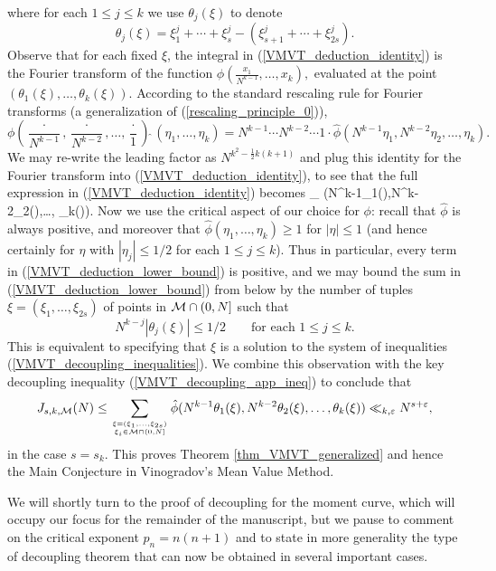 \documentclass[brochure,english,12pt]{bourbaki}%
\begin{document}
\eeq
where for each $1 \leq j \leq k$ we use $\theta_j(\xi)$ to denote
\[ \theta_j(\xi) = \xi_1^j + \cdots+ \xi_s^j  - (\xi_{s+1}^j + \cdots+ \xi_{2s}^j) .\]
Observe that for each fixed $\xi$, the integral  in (\ref{VMVT_deduction_identity}) is the Fourier transform of the function $\phi( \frac{x_1}{N^{k-1}}, \ldots, x_k),$ evaluated at the point $(\theta_1(\xi), \ldots, \theta_k(\xi))$. 
According to the standard rescaling rule for Fourier transforms (a generalization of (\ref{rescaling_principle_0})), 
\[  \phi ( \frac{\cdot}{N^{k-1}}, \frac{\cdot}{N^{k-2}},\ldots, \frac{\cdot}{1} ) \hat{\;}(\eta_1,\ldots, \eta_k) =  
N^{k-1} \cdots N^{k-2} \cdots 1 \cdot \hat{\phi} (N^{k-1}\eta_1,N^{k-2}\eta_2,\ldots, \eta_k).
\]
We may re-write the leading factor as $N^{k^2 - \frac{1}{2}k(k+1)}$ and plug this identity for the Fourier transform into (\ref{VMVT_deduction_identity}), to see that the full expression in (\ref{VMVT_deduction_identity}) becomes
\beq\label{VMVT_deduction_lower_bound}
 \sum_{\bstack{\xi = (\xi_1,\ldots, \xi_{2s}) }{\xi_i \in \Mcal \intersect (0,N]}} 
 \hat{\phi} (N^{k-1}\theta_1(\xi),N^{k-2}\theta_2(\xi),\ldots, \theta_k(\xi)).
\eeq
Now we use the critical aspect of our choice for $\phi$: recall that $\hat{\phi}$ is always positive, and moreover that $\hat{\phi}(\eta_1,\ldots, \eta_k) \geq 1$ for $|\eta| \leq 1$ (and hence certainly for $\eta$ with $|\eta_j| \leq 1/2$ for each $1 \leq j \leq k$). Thus in particular, every term in (\ref{VMVT_deduction_lower_bound}) is positive, and we may bound the sum in  (\ref{VMVT_deduction_lower_bound}) from below by 
the number of tuples $\xi = (\xi_1, \ldots, \xi_{2s})$ of points in $\mathcal{M} \cap (0,N]$ 
such that 
\[ N^{k-j}|\theta_j(\xi)| \leq 1/2 \qquad  \text{for each $1 \leq j \leq k.$}\]
This is equivalent to specifying that $\xi$ is a solution to the system of inequalities (\ref{VMVT_decoupling_inequalities}). 
We combine this observation with the key decoupling inequality (\ref{VMVT_decoupling_app_ineq}) to conclude that 
\[  J_{s,k,\mathcal{M}}(N) \leq \sum_{\xi = (\xi_1,\ldots, \xi_{2s})  \atop \xi_i \in \mathcal{M} \cap (0,N]} 
 \hat{\phi} (N^{k-1}\theta_1(\xi),N^{k-2}\theta_2(\xi),\ldots, \theta_k(\xi)) 
 	\ll_{k,\varepsilon} N^{s+\varepsilon} ,
	\]
	in the case $s=s_k$. This proves Theorem \ref{thm_VMVT_generalized} and hence the Main Conjecture in Vinogradov's Mean Value Method.

We will shortly turn to the proof of decoupling for the moment curve, which will occupy our focus for the remainder of the manuscript, but we pause to comment on the critical exponent $p_n = n(n+1)$ and to state in more generality the type of decoupling theorem that can now be obtained in several important cases.
\end{document}

